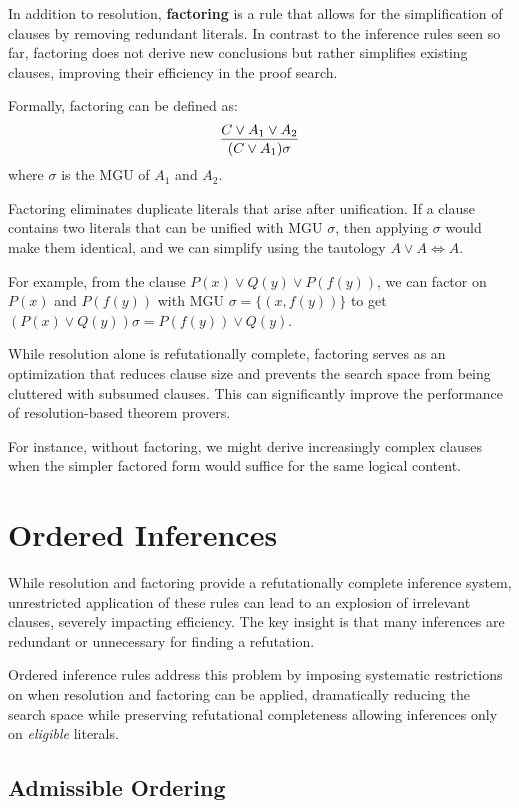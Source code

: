 In addition to resolution, \textbf{factoring} is a rule that allows for the simplification of clauses by removing redundant literals.
In contrast to the inference rules seen so far, factoring does not derive new conclusions but rather simplifies existing clauses, improving their efficiency in the proof search.

Formally, factoring can be defined as:
\begin{equation}
  \infer{(C \lor A_1)\sigma}{C \lor A_1 \lor A_2}
\end{equation}
\indent where \(\sigma\) is the MGU of \(A_1\) and \(A_2\).

\noindent Factoring eliminates duplicate literals that arise after unification. If a clause contains two literals that can be unified with MGU \(\sigma\), then applying \(\sigma\) would make them identical, and we can simplify using the tautology \(A \lor A \iff A\).

For example, from the clause \(P(x) \lor Q(y) \lor P(f(y))\), we can factor on \(P(x)\) and \(P(f(y))\) with MGU \(\sigma = \{(x , f(y))\}\) to get \((P(x) \lor Q(y))\sigma = P(f(y)) \lor Q(y)\).

While resolution alone is refutationally complete, factoring serves as an optimization that reduces clause size and prevents the search space from being cluttered with subsumed clauses. This can significantly improve the performance of resolution-based theorem provers.

For instance, without factoring, we might derive increasingly complex clauses when the simpler factored form would suffice for the same logical content.

\section{Ordered Inferences}

While resolution and factoring provide a refutationally complete inference system, unrestricted application of these rules can lead to an explosion of irrelevant clauses, severely impacting efficiency. The key insight is that many inferences are redundant or unnecessary for finding a refutation.

Ordered inference rules address this problem by imposing systematic restrictions on when resolution and factoring can be applied, dramatically reducing the search space while preserving refutational completeness allowing inferences only on \emph{eligible} literals.

\subsection{Admissible Ordering}

